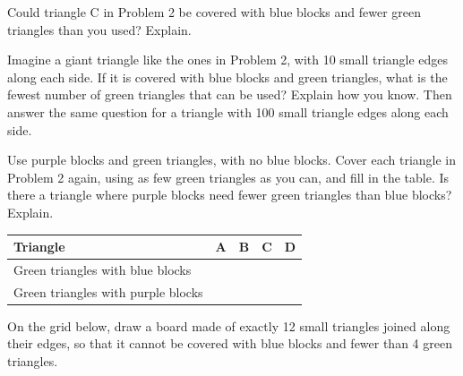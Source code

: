 \documentclass[12pt]{article}
\begin{document}
\vspace{0.45in}

\newpage


\vspace{0.6in}

\newpage

 Could triangle C in Problem 2 be covered with blue blocks and fewer green triangles than you used? Explain.

\vspace{3.6in}
 Imagine a giant triangle like the ones in Problem 2, with 10 small triangle edges along each side. If it is covered with blue blocks and green triangles, what is the fewest number of green triangles that can be used? Explain how you know. Then answer the same question for a triangle with 100 small triangle edges along each side.

\newpage

 Use purple blocks and green triangles, with no blue blocks. Cover each triangle in Problem 2 again, using as few green triangles as you can, and fill in the table. Is there a triangle where purple blocks need fewer green triangles than blue blocks? Explain.

\vspace{0.4in}
\centering
\renewcommand{\arraystretch}{2.2}
\begin{tabular}{|l|>{\centering\arraybackslash}p{0.75in}|>{\centering\arraybackslash}p{0.75in}|>{\centering\arraybackslash}p{0.75in}|>{\centering\arraybackslash}p{0.75in}|}
\hline
Triangle & A & B & C & D\\ \hline
Green triangles with blue blocks & & & & \\ \hline
Green triangles with purple blocks & & & & \\ \hline
\end{tabular}

\raggedright
\newpage

 On the grid below, draw a board made of exactly 12 small triangles joined along their edges, so that it cannot be covered with blue blocks and fewer than 4 green triangles.

\vspace{0.4in}
\centering
{}
\end{document}
